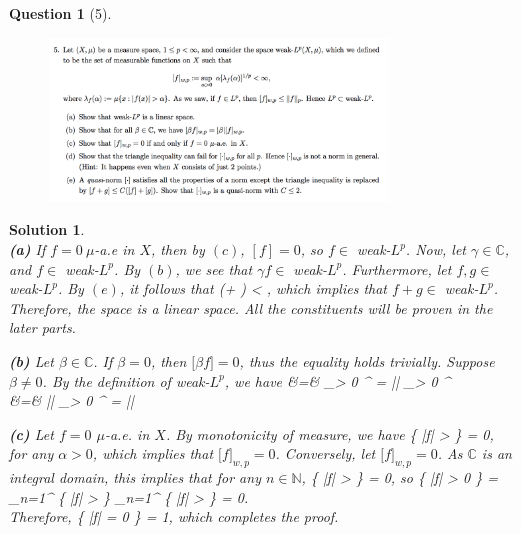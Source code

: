 \documentclass{article} %
\def\eQb#1\eQe{\begin{eqnarray*}#1\end{eqnarray*}}
\theoremstyle{quest}
\newtheorem*{question}{Question}
\newtheorem*{solution}{Solution}
\begin{document}
\begin{question}[5]
\hfill
\begin{figure}[h!]
  \centering
    \includegraphics[width=0.8\textwidth]{HA-4-5.png}
\end{figure}
\end{question}
\begin{solution} \hfill \\
\textbf{(a)}
If $f = 0 \> \mu$-a.e in $X$, then by $(c)$, $[f] = 0$, so $f \in $ weak-$L^p$. 
Now, let $\gamma \in \mathbb{C}$, and $f \in $ weak-$L^p$. By $(b)$, we see that $\gamma f \in 
$ weak-$L^p$. Furthermore, let $f,g \in$ weak-$L^p$. By $(e)$, it follows that
\eQb
\big[f+g \big] (\big[ f \big] + \big[ g \big]) < \infty,
\eQe 
which implies that $f+g \in $ weak-$L^p$. Therefore, the space is a linear space. All the
constituents will be proven in the later parts. 

\bigskip

\textbf{(b)} Let $\beta \in \mathbb{C}$. If $\beta = 0$, then $\big[ \beta f\big] 
= 0$, thus the equality holds trivially. Suppose $\beta \neq 0$. 
By the definition of weak-$L^p$, we have
\eQb
\big[ \beta f \big] &=& 
\sup_{\alpha > 0} 
\alpha {}^{} 
=  |\beta| \sup_{\alpha > 0} 
\frac{\alpha}{|\beta|} ^{} \\
&=& |\beta| \sup_{\alpha > 0} 
\alpha {}^{} = |\beta|\big[ f\big] \\
\eQe

\bigskip

\textbf{(c)} Let $f = 0$  $\mu$-a.e. in $X$. By monotonicity of measure, we have
\eQb
\mu \{ |f| > \alpha \} = 0,
\eQe
for any $\alpha > 0$, which implies that $\big[ f \big]_{w,p} = 0$. Conversely, 
let $\big[ f \big]_{w,p} = 0$. As $\mathbb{C}$ is an integral domain, this implies that
for any $n \in \mathbb{N}$,
\eQb
\mu\{ |f| >  \} = 0,
\eQe 
so
\eQb
\mu\{ |f| > 0 \} = \mu \bigcup_{n=1}^{\infty} \{ |f| >  \}
\leq \sum_{n=1}^{\infty} \mu \{ |f| >  \} = 0. \\ 
\eQe
Therefore,
\eQb
\mu \{ |f| = 0 \} = 1,
\eQe
which completes the proof. 


\end{solution}
\end{document}
